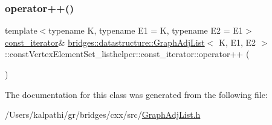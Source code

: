 \subsubsection{\texorpdfstring{operator++()}{operator++()}}
{\footnotesize\ttfamily template$<$typename K, typename E1 = K, typename E2 = E1$>$ \\
\mbox{\hyperlink{classbridges_1_1datastructure_1_1_graph_adj_list_1_1const_vertex_element_set__listhelper_1_1const__iterator}{const\+\_\+iterator}}\& \mbox{\hyperlink{classbridges_1_1datastructure_1_1_graph_adj_list}{bridges\+::datastructure\+::\+Graph\+Adj\+List}}$<$ K, E1, E2 $>$\+::const\+Vertex\+Element\+Set\+\_\+listhelper\+::const\+\_\+iterator\+::operator++ (\begin{DoxyParamCaption}{ }\end{DoxyParamCaption})\hspace{0.3cm}{\ttfamily [inline]}}



The documentation for this class was generated from the following file\+:\begin{DoxyCompactItemize}
\item 
/\+Users/kalpathi/gr/bridges/cxx/src/\mbox{\hyperlink{_graph_adj_list_8h}{Graph\+Adj\+List.\+h}}\end{DoxyCompactItemize}

